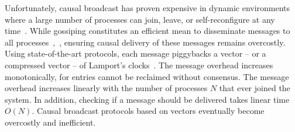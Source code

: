 
Unfortunately, causal broadcast has proven expensive in dynamic environments
where a large number of processes can join, leave, or self-reconfigure at any
time~\cite{charronbost1991concerning}. While gossiping constitutes an efficient
mean to disseminate messages to all
processes~\cite{demers1987epidemic},~\cite{birman1999bimodal}, ensuring causal
delivery of these messages remains overcostly.  Using state-of-the-art
protocols, each message piggybacks a vector -- or a compressed vector -- of
Lamport's
clocks~\cite{almeida2008interval,fidge1988timestamps,mattern1989virtual,singhal1992efficient}.
The message overhead increases monotonically, for entries cannot be reclaimed
without consensus. The message overhead increases linearly with the number of
processes $N$ that ever joined the system.  In addition, checking if a message
should be delivered takes linear time $O(N)$. Causal broadcast protocols based
on vectors eventually become overcostly and inefficient.


